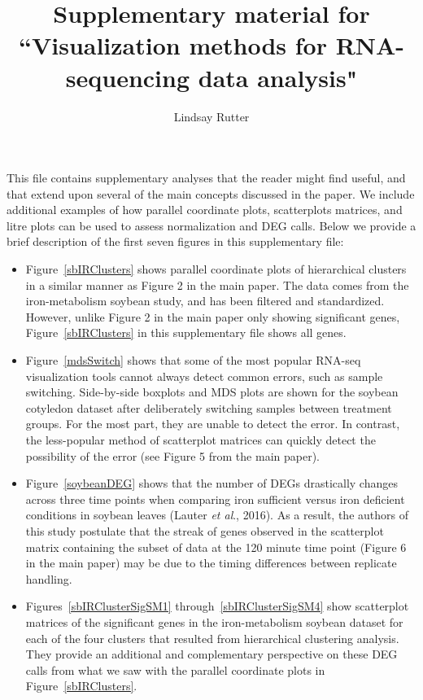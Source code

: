 \documentclass{article}
\begin{document}
\title{Supplementary material for ``Visualization methods for RNA-sequencing data analysis"}
  \author{Lindsay Rutter}
  
  \maketitle
  
  This file contains supplementary analyses that the reader might find useful, and that extend upon several of the main concepts discussed in the paper. We include additional examples of how parallel coordinate plots, scatterplots matrices, and litre plots can be used to assess normalization and DEG calls. Below we provide a brief description of the first seven figures in this supplementary file:
  
  \begin{itemize}
  
  \item Figure~\ref{sbIRClusters} shows parallel coordinate plots of hierarchical clusters in a similar manner as Figure 2 in the main paper. The data comes from the iron-metabolism soybean study, and has been filtered and standardized. However, unlike Figure 2 in the main paper only showing significant genes, Figure~\ref{sbIRClusters} in this supplementary file shows all genes.
  
  \item Figure~\ref{mdsSwitch} shows that some of the most popular RNA-seq visualization tools cannot always detect common errors, such as sample switching. Side-by-side boxplots and MDS plots are shown for the soybean cotyledon dataset after deliberately switching samples between treatment groups. For the most part, they are unable to detect the error. In contrast, the less-popular method of scatterplot matrices can quickly detect the possibility of the error (see Figure 5 from the main paper).
  
  \item Figure~\ref{soybeanDEG} shows that the number of DEGs drastically changes across three time points when comparing iron sufficient versus iron deficient conditions in soybean leaves (Lauter \textit{et al}., 2016). As a result, the authors of this study postulate that the streak of genes observed in the scatterplot matrix containing the subset of data at the 120 minute time point (Figure 6 in the main paper) may be due to the timing differences between replicate handling.
  
  \item Figures~\ref{sbIRClusterSigSM1} through~\ref{sbIRClusterSigSM4} show scatterplot matrices of the significant genes in the iron-metabolism soybean dataset for each of the four clusters that resulted from hierarchical clustering analysis. They provide an additional and complementary perspective on these DEG calls from what we saw with the parallel coordinate plots in Figure~\ref{sbIRClusters}. 
  

\end{itemize}
\end{document}
